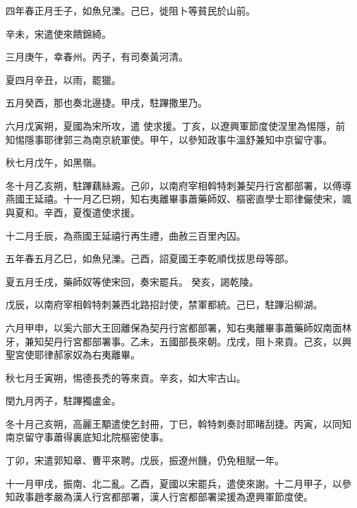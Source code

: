 \begin{pinyinscope}
 四年春正月壬子，如魚兒濼。己巳，徙阻卜等貧民於山前。



 辛未，宋遣使來饋錦綺。



 三月庚午，幸春州。丙子，有司奏黃河清。



 夏四月辛丑，以雨，罷獵。



 五月癸酉，那也奏北邊捷。甲戌，駐蹕撒里乃。



 六月戊寅朔，夏國為宋所攻，遣
 使求援。丁亥，以遼興軍節度使涅里為惕隱，前知惕隱事耶律郭三為南京統軍使。甲午，以參知政事牛溫舒兼知中京留守事。



 秋七月戊午，如黑嶺。



 冬十月乙亥朔，駐蹕藕絲澱。己卯，以南府宰相斡特刺兼契丹行宮都部署，以傅導燕國王延禧。十一月乙巳朔，知右夷離畢事蕭藥師奴、樞密直學士耶律儼使宋，颯與夏和。辛酉，夏復遣使求援。



 十二月壬辰，為燕國王延禧行再生禮，曲赦三百里內囚。



 五年春五月乙巳，如魚兒濼。己酉，詔夏國王李乾順伐拔思母等部。



 夏五月壬戌，藥師奴等使宋回，奏宋罷兵。
 癸亥，謁乾陵。



 戊辰，以南府宰相斡特刺兼西北路招討使，禁軍都統。己巳，駐蹕沿柳湖。



 六月甲申，以奚六部大王回離保為契丹行宮都部署，知右夷離畢事蕭藥師奴南面林牙，兼知契丹行宮都部署事。乙未，五國部長來朝。戊戌，阻卜來貢。己亥，以興聖宮使耶律郝家奴為右夷離畢。



 秋七月壬寅朔，惕德長禿的等來貢。辛亥，如大牢古山。



 閏九月丙子，駐蹕獨盧金。



 冬十月己亥朔，高麗王顒遣使乞封冊，丁巳，斡特刺奏討耶睹刮捷。丙寅，以同知南京留守事蕭得裏底知北院樞密使事。



 丁卯，宋遣郭知章、曹平來聘。戊辰，振遼州饑，仍免租賦一年。



 十一月甲戌，振南、北二亂。乙酉，夏國以宋罷兵，遣使來謝。十二月甲子，以參知政事趙孝嚴為漢人行宮都部署，漢人行宮都部署梁援為遼興軍節度使。




\end{pinyinscope}
